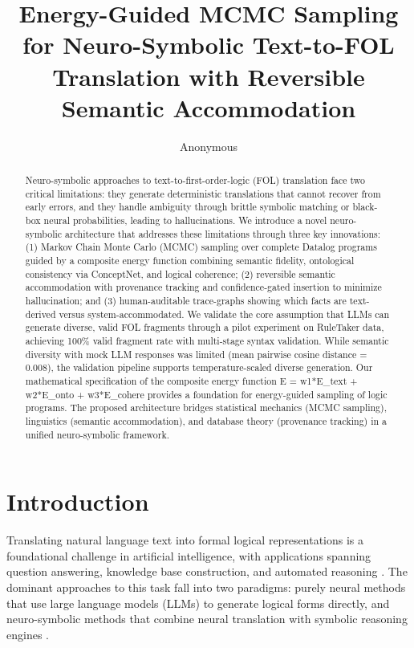 \documentclass[11pt,letterpaper]{article}
\title{Energy-Guided MCMC Sampling for Neuro-Symbolic Text-to-FOL Translation with Reversible Semantic Accommodation}
\author{Anonymous}
\date{}
\begin{document}
\maketitle

\begin{abstract}
Neuro-symbolic approaches to text-to-first-order-logic (FOL) translation face two critical limitations: they generate deterministic translations that cannot recover from early errors, and they handle ambiguity through brittle symbolic matching or black-box neural probabilities, leading to hallucinations. We introduce a novel neuro-symbolic architecture that addresses these limitations through three key innovations: (1) Markov Chain Monte Carlo (MCMC) sampling over complete Datalog programs guided by a composite energy function combining semantic fidelity, ontological consistency via ConceptNet, and logical coherence; (2) reversible semantic accommodation with provenance tracking and confidence-gated insertion to minimize hallucination; and (3) human-auditable trace-graphs showing which facts are text-derived versus system-accommodated. We validate the core assumption that LLMs can generate diverse, valid FOL fragments through a pilot experiment on RuleTaker data, achieving 100\% valid fragment rate with multi-stage syntax validation. While semantic diversity with mock LLM responses was limited (mean pairwise cosine distance = 0.008), the validation pipeline supports temperature-scaled diverse generation. Our mathematical specification of the composite energy function E = w1*E\_text + w2*E\_onto + w3*E\_cohere provides a foundation for energy-guided sampling of logic programs. The proposed architecture bridges statistical mechanics (MCMC sampling), linguistics (semantic accommodation), and database theory (provenance tracking) in a unified neuro-symbolic framework.
\end{abstract}

\section{Introduction}

Translating natural language text into formal logical representations is a foundational challenge in artificial intelligence, with applications spanning question answering, knowledge base construction, and automated reasoning \cite{Clark2020}. The dominant approaches to this task fall into two paradigms: purely neural methods that use large language models (LLMs) to generate logical forms directly, and neuro-symbolic methods that combine neural translation with symbolic reasoning engines \cite{Pan2023, Rocktaschel2017}.
\end{document}
